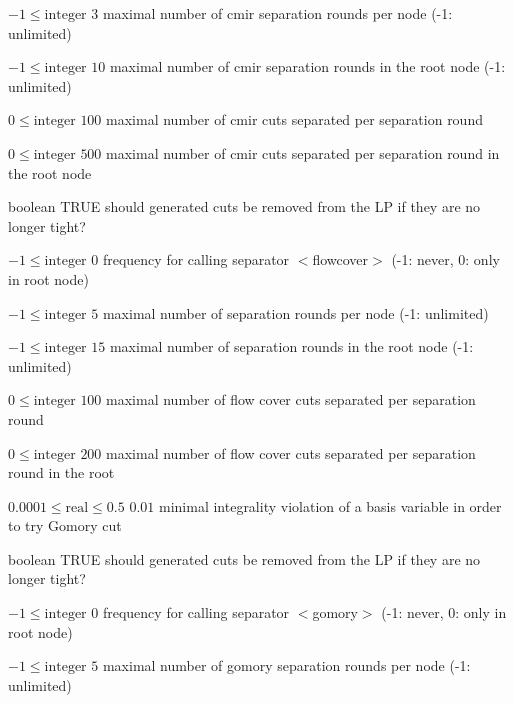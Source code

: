 %
{$-1\leq\textrm{integer}$}%
{$3$}%
{maximal number of cmir separation rounds per node (-1: unlimited)}%
{}

%
{$-1\leq\textrm{integer}$}%
{$10$}%
{maximal number of cmir separation rounds in the root node (-1: unlimited)}%
{}

%
{$0\leq\textrm{integer}$}%
{$100$}%
{maximal number of cmir cuts separated per separation round}%
{}

%
{$0\leq\textrm{integer}$}%
{$500$}%
{maximal number of cmir cuts separated per separation round in the root node}%
{}

%
{boolean}%
{TRUE}%
{should generated cuts be removed from the LP if they are no longer tight?}%
{}

%
{$-1\leq\textrm{integer}$}%
{$0$}%
{frequency for calling separator $<$flowcover$>$ (-1: never, 0: only in root node)}%
{}

%
{$-1\leq\textrm{integer}$}%
{$5$}%
{maximal number of separation rounds per node (-1: unlimited)}%
{}

%
{$-1\leq\textrm{integer}$}%
{$15$}%
{maximal number of separation rounds in the root node (-1: unlimited)}%
{}

%
{$0\leq\textrm{integer}$}%
{$100$}%
{maximal number of flow cover cuts separated per separation round}%
{}

%
{$0\leq\textrm{integer}$}%
{$200$}%
{maximal number of flow cover cuts separated per separation round in the root}%
{}

%
{$0.0001\leq\textrm{real}\leq0.5$}%
{$0.01$}%
{minimal integrality violation of a basis variable in order to try Gomory cut}%
{}

%
{boolean}%
{TRUE}%
{should generated cuts be removed from the LP if they are no longer tight?}%
{}

%
{$-1\leq\textrm{integer}$}%
{$0$}%
{frequency for calling separator $<$gomory$>$ (-1: never, 0: only in root node)}%
{}

%
{$-1\leq\textrm{integer}$}%
{$5$}%
{maximal number of gomory separation rounds per node (-1: unlimited)}%
{}

